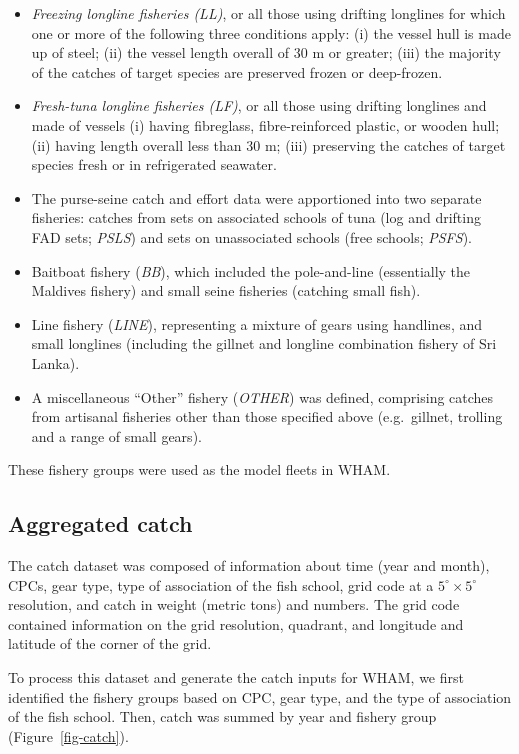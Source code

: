 \documentclass[
]{scrartcl}
\begin{document}
\begin{itemize}
\item
  \emph{Freezing longline fisheries (LL)}, or all those using drifting
  longlines for which one or more of the following three conditions
  apply: (i) the vessel hull is made up of steel; (ii) the vessel length
  overall of 30 m or greater; (iii) the majority of the catches of
  target species are preserved frozen or deep-frozen.
\item
  \emph{Fresh-tuna longline fisheries (LF)}, or all those using drifting
  longlines and made of vessels (i) having fibreglass, fibre-reinforced
  plastic, or wooden hull; (ii) having length overall less than 30 m;
  (iii) preserving the catches of target species fresh or in
  refrigerated seawater.
\item
  The purse-seine catch and effort data were apportioned into two
  separate fisheries: catches from sets on associated schools of tuna
  (log and drifting FAD sets; \emph{PSLS}) and sets on unassociated
  schools (free schools; \emph{PSFS}).
\item
  Baitboat fishery (\emph{BB}), which included the pole-and-line
  (essentially the Maldives fishery) and small seine fisheries (catching
  small fish).
\item
  Line fishery (\emph{LINE}), representing a mixture of gears using
  handlines, and small longlines (including the gillnet and longline
  combination fishery of Sri Lanka).
\item
  A miscellaneous ``Other'' fishery (\emph{OTHER}) was defined,
  comprising catches from artisanal fisheries other than those specified
  above (e.g.~gillnet, trolling and a range of small gears).
\end{itemize}

These fishery groups were used as the model fleets in WHAM.

\subsection{Aggregated catch}\label{aggregated-catch}

The catch dataset was composed of information about time (year and
month), CPCs, gear type, type of association of the fish school, grid
code at a \(5^\circ\times 5^\circ\) resolution, and catch in weight
(metric tons) and numbers. The grid code contained information on the
grid resolution, quadrant, and longitude and latitude of the corner of
the grid.

To process this dataset and generate the catch inputs for WHAM, we first
identified the fishery groups based on CPC, gear type, and the type of
association of the fish school. Then, catch was summed by year and
fishery group (Figure~\ref{fig-catch}).
\end{document}
